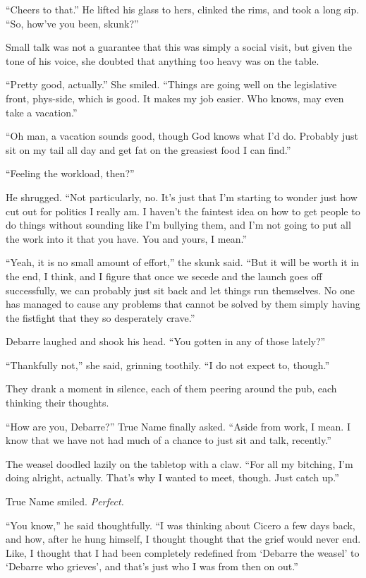 ``Cheers to that.'' He lifted his glass to hers, clinked the rims, and took a long sip. ``So, how've you been, skunk?''

Small talk was not a guarantee that this was simply a social visit, but given the tone of his voice, she doubted that anything too heavy was on the table.

``Pretty good, actually.'' She smiled. ``Things are going well on the legislative front, phys-side, which is good. It makes my job easier. Who knows, may even take a vacation.''

``Oh man, a vacation sounds good, though God knows what I'd do. Probably just sit on my tail all day and get fat on the greasiest food I can find.''

``Feeling the workload, then?''

He shrugged. ``Not particularly, no. It's just that I'm starting to wonder just how cut out for politics I really am. I haven't the faintest idea on how to get people to do things without sounding like I'm bullying them, and I'm not going to put all the work into it that you have. You and yours, I mean.''

``Yeah, it is no small amount of effort,'' the skunk said. ``But it will be worth it in the end, I think, and I figure that once we secede and the launch goes off successfully, we can probably just sit back and let things run themselves. No one has managed to cause any problems that cannot be solved by them simply having the fistfight that they so desperately crave.''

Debarre laughed and shook his head. ``You gotten in any of those lately?''

``Thankfully not,'' she said, grinning toothily. ``I do not expect to, though.''

They drank a moment in silence, each of them peering around the pub, each thinking their thoughts.

``How are you, Debarre?'' True Name finally asked. ``Aside from work, I mean. I know that we have not had much of a chance to just sit and talk, recently.''

The weasel doodled lazily on the tabletop with a claw. ``For all my bitching, I'm doing alright, actually. That's why I wanted to meet, though. Just catch up.''

True Name smiled. \emph{Perfect.}

``You know,'' he said thoughtfully. ``I was thinking about Cicero a few days back, and how, after he hung himself, I thought thought that the grief would never end. Like, I thought that I had been completely redefined from `Debarre the weasel' to `Debarre who grieves', and that's just who I was from then on out.''

